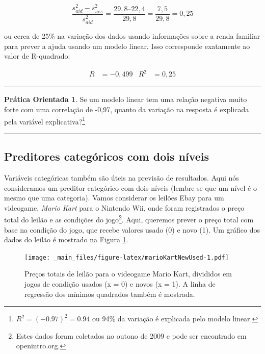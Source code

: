 \documentclass[
]{book}
\theoremstyle{definition}
\theoremstyle{definition}
\theoremstyle{definition}
\newtheorem{exercise}{Prática Orientada}[chapter]
\theoremstyle{definition}
\theoremstyle{remark}
\begin{document}
\[\frac{s_{aid}^2 - s_{_{RES}}^2}{s_{aid}^2}
    = \frac{29,8 – 22,4}{29,8} = \frac{7,5}{29,8}
    = 0,25\]

ou cerca de 25\% na variação dos dados usando informações sobre a renda familiar para prever a ajuda usando um modelo linear. Isso corresponde exatamente ao valor de R-quadrado:

\begin{align*}
R &= -0,499 &R^2 &= 0,25
\end{align*}

\begin{center}\rule{0.5\linewidth}{0.5pt}\end{center}

\begin{exercise}
\protect\hypertarget{exr:unnamed-chunk-279}{}{\label{exr:unnamed-chunk-279} }Se um modelo linear tem uma relação negativa muito forte com uma correlação de -0,97, quanto da variação na resposta é explicada pela variável explicativa?\footnote{\(R^2 = (-0.97)^2 = 0.94\) ou 94\% da variação é explicada pelo modelo linear.}
\end{exercise}

\begin{center}\rule{0.5\linewidth}{0.5pt}\end{center}

\hypertarget{categoricalPredictorsWithTwoLevels}{%
\subsection{Preditores categóricos com dois níveis}\label{categoricalPredictorsWithTwoLevels}}

Variáveis categóricas também são úteis na previsão de resultados. Aqui nós consideramos um preditor categórico com dois níveis (lembre-se que um nível é o mesmo que uma categoria). Vamos considerar os leilões Ebay para um videogame, \emph{Mario Kart} para o Nintendo Wii, onde foram registrados o preço total do leilão e as condições do jogo\footnote{Estes dados foram coletados no outono de 2009 e pode ser encontrado em openintro.org.}. Aqui, queremos prever o preço total com base na condição do jogo, que recebe valores usado (0) e novo (1). Um gráfico dos dados do leilão é mostrado na Figura \ref{fig:marioKartNewUsed}.

\begin{figure}
\centering
\texttt{[image: \_main\_files/figure-latex/marioKartNewUsed-1.pdf]}
\caption{\label{fig:marioKartNewUsed}Preços totais de leilão para o videogame Mario Kart, divididos em jogos de condição usados (x = 0) e novos (x = 1). A linha de regressão dos mínimos quadrados também é mostrada.}
\end{figure}
\end{document}
